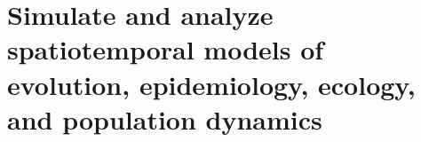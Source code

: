 \chapter{Simulate and analyze spatiotemporal models of evolution, epidemiology, ecology, and population dynamics}
